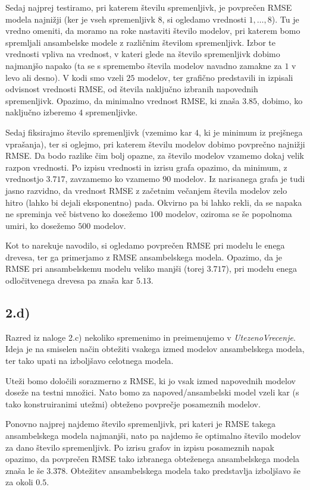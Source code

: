 \documentclass{article}
\begin{document}
Sedaj najprej testiramo, pri katerem številu spremenljivk, je povprečen RMSE modela najnižji (ker je vseh spremenljivk $8$, si ogledamo vrednosti $1,\dots, 8$). 
Tu je vredno omeniti, da moramo na roke nastaviti število modelov, pri katerem bomo spremljali ansambelske modele z različnim številom spremenljivk. 
Izbor te vrednosti vpliva na vrednost, v kateri glede na število spremenljivk dobimo najmanjšo napako (ta se s spremembo števila modelov navadno zamakne za $1$ v levo ali desno). 
V kodi smo vzeli $25$ modelov, ter grafično predstavili in izpisali odvisnost vrednosti RMSE, od števila naključno izbranih napovednih spremenljivk. 
Opazimo, da minimalno vrednost RMSE, ki znaša $3.85$, dobimo, ko naključno izberemo $4$ spremenljivke. 

Sedaj fiksirajmo število spremenljivk (vzemimo kar $4$, ki je minimum iz prejšnega vprašanja), ter si oglejmo, pri katerem številu modelov dobimo povprečno najnižji RMSE.
Da bodo razlike čim bolj opazne, za število modelov vzamemo dokaj velik razpon vrednosti. Po izpisu vrednosti in izrisu grafa opazimo, da minimum, z vrednostjo $3.717$, zavzamemo ko vzamemo $90$ modelov.
Iz narisanega grafa je tudi jasno razvidno, da vrednost RMSE z začetnim večanjem števila modelov zelo hitro (lahko bi dejali eksponentno) pada. 
Okvirno pa bi lahko rekli, da se napaka ne spreminja več bistveno ko dosežemo $100$ modelov, 
oziroma se še popolnoma umiri, ko dosežemo $500$ modelov.

Kot to narekuje navodilo, si ogledamo povprečen RMSE pri modelu le enega drevesa, ter ga primerjamo z RMSE ansambelskega modela. 
Opazimo, da je RMSE pri ansambelskemu modelu veliko manjši (torej $3.717$), pri modelu enega odločitvenega drevesa pa znaša kar $5.13$.

\subsection*{2.d)}

Razred iz naloge 2.c) nekoliko spremenimo in preimenujemo v \textit{UtezenoVrecenje}. 
Ideja je na smiselen način obtežiti vsakega izmed modelov ansambelskega modela, ter tako upati na izboljšavo celotnega modela.

Uteži bomo določili sorazmerno z RMSE, ki jo vsak izmed napovednih modelov doseže na testni množici. Nato bomo za napoved/ansambelski model vzeli kar (s tako konstruiranimi utežmi) obteženo povprečje posameznih modelov. 

Ponovno najprej najdemo število spremenljivk, pri kateri je RMSE takega ansambelskega modela najmanjši, nato pa najdemo še optimalno število modelov za dano število spremenljivk. 
Po izrisu grafov in izpisu posameznih napak opazimo, da povprečen RMSE tako izbranega obteženega ansambelskega modela znaša le še $3.378$. 
Obtežitev ansambelskega modela tako predstavlja izboljšavo še za okoli $0.5$.
\end{document}

